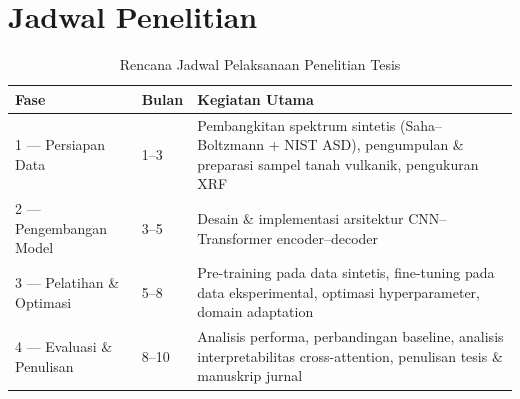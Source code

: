 \documentclass[12pt, a4paper]{article}
\begin{document}
\section{Jadwal Penelitian}
\begin{table}[H]
\centering
\caption{Rencana Jadwal Pelaksanaan Penelitian Tesis}
\small
\begin{tabular}{p{4.5cm}p{1.5cm}p{8cm}}
\toprule
\textbf{Fase} & \textbf{Bulan} & \textbf{Kegiatan Utama} \\
\midrule
1 --- Persiapan Data & 1--3 & Pembangkitan spektrum sintetis (Saha--Boltzmann + NIST ASD), pengumpulan \& preparasi sampel tanah vulkanik, pengukuran XRF \\
2 --- Pengembangan Model & 3--5 & Desain \& implementasi arsitektur CNN--Transformer encoder--decoder \\
3 --- Pelatihan \& Optimasi & 5--8 & Pre-training pada data sintetis, fine-tuning pada data eksperimental, optimasi hyperparameter, domain adaptation \\
4 --- Evaluasi \& Penulisan & 8--10 & Analisis performa, perbandingan baseline, analisis interpretabilitas cross-attention, penulisan tesis \& manuskrip jurnal \\
\bottomrule
\end{tabular}
\end{table}

\renewcommand{\refname}{Daftar Pustaka}


\end{document}

